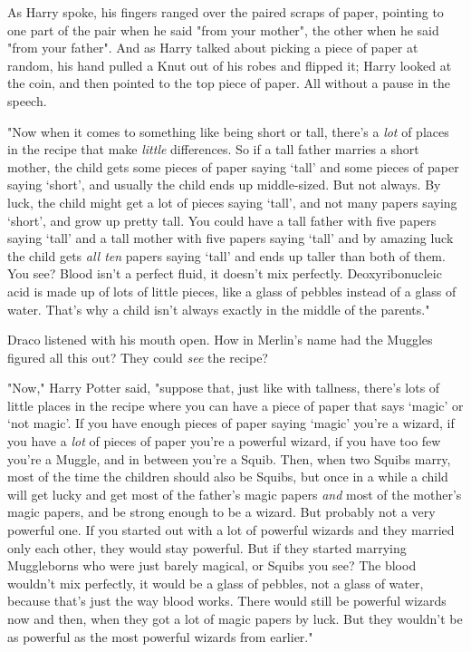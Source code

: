 As Harry spoke, his fingers ranged over the paired scraps of paper, pointing to
one part of the pair when he said "from your mother", the other when he said
"from your father". And as Harry talked about picking a piece of paper at
random, his hand pulled a Knut out of his robes and flipped it; Harry looked at
the coin, and then pointed to the top piece of paper. All without a pause in
the speech.

"Now when it comes to something like being short or tall, there's a \emph{lot}
of places in the recipe that make \emph{little} differences. So if a tall
father marries a short mother, the child gets some pieces of paper saying
`tall' and some pieces of paper saying `short', and usually the child ends up
middle-sized. But not always. By luck, the child might get a lot of pieces
saying `tall', and not many papers saying `short', and grow up pretty tall. You
could have a tall father with five papers saying `tall' and a tall mother with
five papers saying `tall' and by amazing luck the child gets \emph{all ten}
papers saying `tall' and ends up taller than both of them. You see? Blood isn't
a perfect fluid, it doesn't mix perfectly. Deoxyribonucleic acid is made up of
lots of little pieces, like a glass of pebbles instead of a glass of water.
That's why a child isn't always exactly in the middle of the parents."

Draco listened with his mouth open. How in Merlin's name had the Muggles
figured all this out? They could \emph{see} the recipe?

"Now," Harry Potter said, "suppose that, just like with tallness, there's lots
of little places in the recipe where you can have a piece of paper that says
`magic' or `not magic'. If you have enough pieces of paper saying `magic'
you're a wizard, if you have a \emph{lot} of pieces of paper you're a powerful
wizard, if you have too few you're a Muggle, and in between you're a Squib.
Then, when two Squibs marry, most of the time the children should also be
Squibs, but once in a while a child will get lucky and get most of the father's
magic papers \emph{and} most of the mother's magic papers, and be strong enough
to be a wizard. But probably not a very powerful one. If you started out with a
lot of powerful wizards and they married only each other, they would stay
powerful. But if they started marrying Muggleborns who were just barely
magical, or Squibs{\el} you see? The blood wouldn't mix perfectly, it would
be a glass of pebbles, not a glass of water, because that's just the way blood
works. There would still be powerful wizards now and then, when they got a lot
of magic papers by luck. But they wouldn't be as powerful as the most powerful
wizards from earlier."


